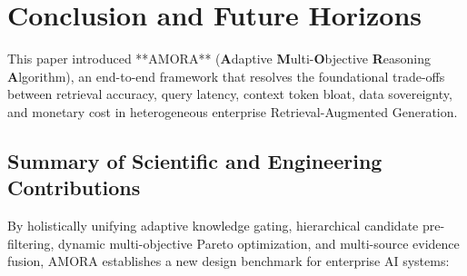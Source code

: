 \section{Conclusion and Future Horizons}
\label{sec:conclusion}

This paper introduced **AMORA** (\textbf{A}daptive \textbf{M}ulti-\textbf{O}bjective \textbf{R}easoning \textbf{A}lgorithm), an end-to-end framework that resolves the foundational trade-offs between retrieval accuracy, query latency, context token bloat, data sovereignty, and monetary cost in heterogeneous enterprise Retrieval-Augmented Generation.

\subsection{Summary of Scientific and Engineering Contributions}
By holistically unifying adaptive knowledge gating, hierarchical candidate pre-filtering, dynamic multi-objective Pareto optimization, and multi-source evidence fusion, AMORA establishes a new design benchmark for enterprise AI systems:

